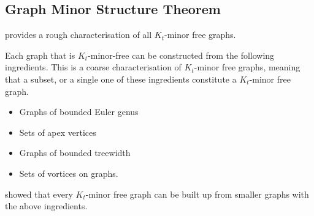 \subsection{Graph Minor Structure Theorem}\label{sec:Kt_Minor_Free}
\textcite{robertsonGraphMinorsXVII1999} provides a rough characterisation of all \(K_t\)-minor free graphs. 

Each graph that is $K_t$-minor-free can be constructed from the following ingredients. This is a coarse characterisation of $K_t$-minor free graphs, meaning that a subset, or a single one of these ingredients constitute a $K_t$-minor free graph. 
\begin{itemize}
	\item Graphs of bounded Euler genus
	\item Sets of apex vertices
	\item Graphs of bounded treewidth
	\item Sets of vortices on graphs.
\end{itemize}
\textcite{robertsonGraphMinorsXVII1999} showed that every \(K_t\)-minor free graph can be built up from smaller graphs with the above ingredients.